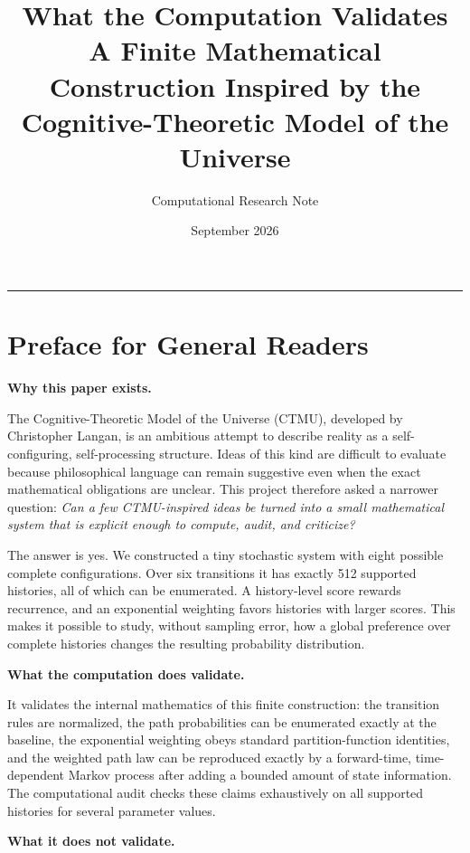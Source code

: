 \documentclass[11pt]{article}
\title{\textbf{What the Computation Validates}\\[0.35em]
\large A Finite Mathematical Construction Inspired by the Cognitive-Theoretic Model of the Universe}
\author{Computational Research Note}
\date{September 2026}
\theoremstyle{remark}
\newcommand{\CTMU}{\textsc{CTMU}}
\begin{document}
\maketitle

\begin{center}
\rule{0.92\textwidth}{0.5pt}
\end{center}

\section*{Preface for General Readers}

\begingroup
\setlength{\fboxsep}{12pt}
\noindent\colorbox{prefacegray}{%
\begin{minipage}{0.94\textwidth}
\textbf{Why this paper exists.}

The Cognitive-Theoretic Model of the Universe (\CTMU), developed by Christopher Langan, is an ambitious attempt to describe reality as a self-configuring, self-processing structure. Ideas of this kind are difficult to evaluate because philosophical language can remain suggestive even when the exact mathematical obligations are unclear. This project therefore asked a narrower question: \emph{Can a few CTMU-inspired ideas be turned into a small mathematical system that is explicit enough to compute, audit, and criticize?}

The answer is yes. We constructed a tiny stochastic system with eight possible complete configurations. Over six transitions it has exactly 512 supported histories, all of which can be enumerated. A history-level score rewards recurrence, and an exponential weighting favors histories with larger scores. This makes it possible to study, without sampling error, how a global preference over complete histories changes the resulting probability distribution.

\textbf{What the computation does validate.}

It validates the internal mathematics of this finite construction: the transition rules are normalized, the path probabilities can be enumerated exactly at the baseline, the exponential weighting obeys standard partition-function identities, and the weighted path law can be reproduced exactly by a forward-time, time-dependent Markov process after adding a bounded amount of state information. The computational audit checks these claims exhaustively on all supported histories for several parameter values.

\textbf{What it does not validate.}


\end{minipage}}
\end{document}
